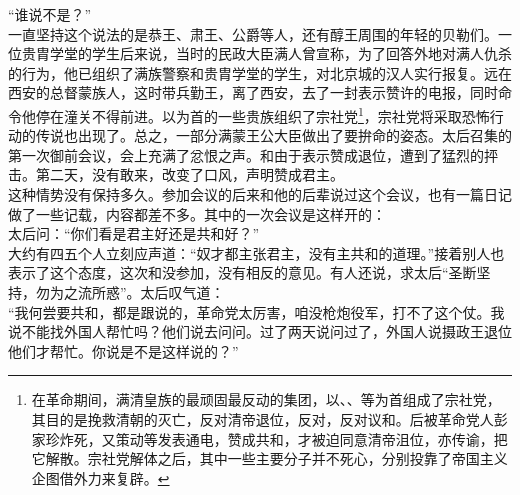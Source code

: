“谁说不是？”\\

一直坚持这个说法的是恭王、肃王、公爵等人，还有醇王周围的年轻的贝勒们。一位贵胄学堂的学生后来说，当时的民政大臣满人曾宣称，为了回答外地对满人仇杀的行为，他已组织了满族警察和贵胄学堂的学生，对北京城的汉人实行报复。远在西安的总督蒙族人，这时带兵勤王，离了西安，去了一封表示赞许的电报，同时命令他停在潼关不得前进。以为首的一些贵族组织了宗社党\footnote{在革命期间，满清皇族的最顽固最反动的集团，以、、等为首组成了宗社党，其目的是挽救清朝的灭亡，反对清帝退位，反对，反对议和。后被革命党人彭家珍炸死，又策动等发表通电，赞成共和，才被迫同意清帝沮位，亦传谕，把它解散。宗社党解体之后，其中一些主要分子并不死心，分别投靠了帝国主义企图借外力来复辟。}，宗社党将采取恐怖行动的传说也出现了。总之，一部分满蒙王公大臣做出了要拚命的姿态。太后召集的第一次御前会议，会上充满了忿恨之声。和由于表示赞成退位，遭到了猛烈的抨击。第二天，没有敢来，改变了口风，声明赞成君主。\\

这种情势没有保持多久。参加会议的后来和他的后辈说过这个会议，也有一篇日记做了一些记载，内容都差不多。其中的一次会议是这样开的：\\

太后问：“你们看是君主好还是共和好？”\\

大约有四五个人立刻应声道：“奴才都主张君主，没有主共和的道理。”接着别人也表示了这个态度，这次和没参加，没有相反的意见。有人还说，求太后“圣断坚持，勿为之流所惑”。太后叹气道：\\

“我何尝要共和，都是跟说的，革命党太厉害，咱没枪炮役军，打不了这个仗。我说不能找外国人帮忙吗？他们说去问问。过了两天说问过了，外国人说摄政王退位他们才帮忙。你说是不是这样说的？”\\

